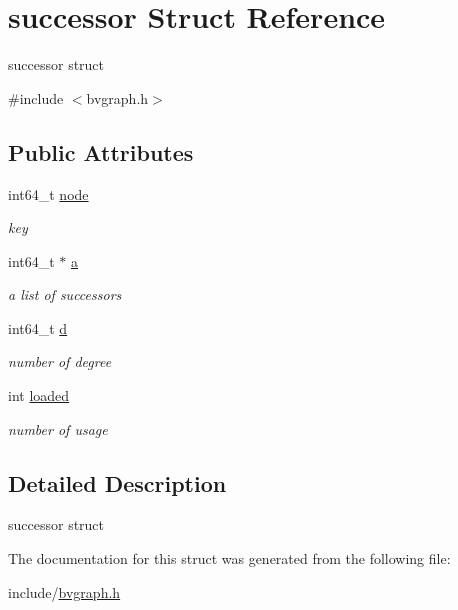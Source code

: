 \hypertarget{structsuccessor}{\section{successor Struct Reference}
\label{structsuccessor}
}


successor struct  




{\ttfamily \#include $<$bvgraph.\+h$>$}

\subsection*{Public Attributes}
\begin{DoxyCompactItemize}
\item 
\hypertarget{structsuccessor_a8f9ae825dc91513a62ca23486ce3b1cb}{int64\+\_\+t \hyperlink{structsuccessor_a8f9ae825dc91513a62ca23486ce3b1cb}{node}}\label{structsuccessor_a8f9ae825dc91513a62ca23486ce3b1cb}

\begin{DoxyCompactList}\small\item\em key \end{DoxyCompactList}\item 
\hypertarget{structsuccessor_a4d02000ceda0c162a5b08f13e8c81b50}{int64\+\_\+t $\ast$ \hyperlink{structsuccessor_a4d02000ceda0c162a5b08f13e8c81b50}{a}}\label{structsuccessor_a4d02000ceda0c162a5b08f13e8c81b50}

\begin{DoxyCompactList}\small\item\em a list of successors \end{DoxyCompactList}\item 
\hypertarget{structsuccessor_a9fca9f50ae45f327c5b3a78d5cffc80b}{int64\+\_\+t \hyperlink{structsuccessor_a9fca9f50ae45f327c5b3a78d5cffc80b}{d}}\label{structsuccessor_a9fca9f50ae45f327c5b3a78d5cffc80b}

\begin{DoxyCompactList}\small\item\em number of degree \end{DoxyCompactList}\item 
\hypertarget{structsuccessor_a823adf417dd9b58be5f561223587287a}{int \hyperlink{structsuccessor_a823adf417dd9b58be5f561223587287a}{loaded}}\label{structsuccessor_a823adf417dd9b58be5f561223587287a}

\begin{DoxyCompactList}\small\item\em number of usage \end{DoxyCompactList}\end{DoxyCompactItemize}


\subsection{Detailed Description}
successor struct 

The documentation for this struct was generated from the following file\+:\begin{DoxyCompactItemize}
\item 
include/\hyperlink{bvgraph_8h}{bvgraph.\+h}\end{DoxyCompactItemize}
